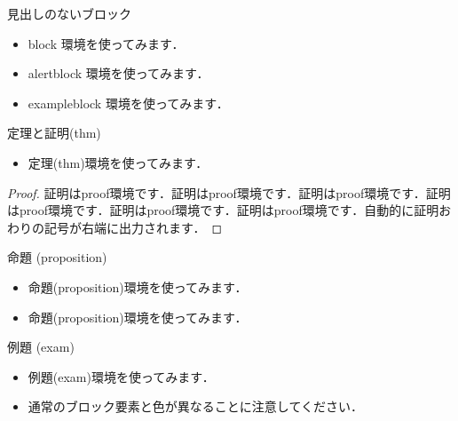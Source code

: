 \begin{frame}{見出しのないブロック}
  \begin{block}{}
    \begin{itemize}
      \item block 環境を使ってみます．
    \end{itemize}
  \end{block}
  \begin{alertblock}{}
    \begin{itemize}
      \item alertblock 環境を使ってみます．
    \end{itemize}
  \end{alertblock}
  \begin{exampleblock}{}
    \begin{itemize}
      \item exampleblock 環境を使ってみます．
    \end{itemize}
  \end{exampleblock}
\end{frame}

\begin{frame}{定理と証明(thm)}
  \begin{thm}
    \begin{itemize}
      \item 定理(thm)環境を使ってみます．
    \end{itemize}
  \end{thm}
  \begin{proof}
    証明はproof環境です．証明はproof環境です．証明はproof環境です．証明はproof環境です．証明はproof環境です．証明はproof環境です．自動的に証明おわりの記号が右端に出力されます．
  \end{proof}
\end{frame}

\begin{frame}{命題 (proposition)}
  \begin{proposition}
    \begin{itemize}
      \item 命題(proposition)環境を使ってみます．
      \item 命題(proposition)環境を使ってみます．
    \end{itemize}
  \end{proposition}
\end{frame}

\begin{frame}{例題 (exam)}
  \begin{exam}
    \begin{itemize}
      \item 例題(exam)環境を使ってみます．
      \item 通常のブロック要素と色が異なることに注意してください．
    \end{itemize}
  \end{exam}
\end{frame}

